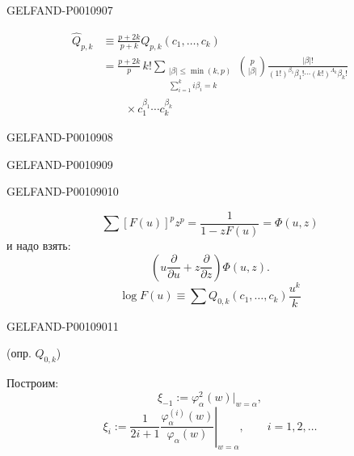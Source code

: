 \begin{GelfandAdjacentEvidence}{GELFAND-P001090}{7}


\begin{equation*}
\begin{aligned}
\widehat Q_{p,k}
&\equiv\frac{p+2k}{p+k}Q_{p,k}(c_1,\ldots,c_k)\\
&=\frac{p+2k}{p}\,k!
\sum_{\substack{\lvert\beta\rvert\le\min(k,p)\\\sum_{i=1}^k i\beta_i=k}}
\binom{p}{\lvert\beta\rvert}
\frac{\lvert\beta\rvert!}{(1!)^{\beta_1}\beta_1!\cdots(k!)^{\Lambda_k}\beta_k!}\\
&\qquad{}\times c_1^{\beta_1}\cdots c_k^{\beta_k}
\end{aligned}
\tag{7}
\end{equation*}
\end{GelfandAdjacentEvidence}
\begin{GelfandAdjacentEvidence}{GELFAND-P001090}{8}

\end{GelfandAdjacentEvidence}
\begin{GelfandAdjacentEvidence}{GELFAND-P001090}{9}

\end{GelfandAdjacentEvidence}
\begin{GelfandAdjacentEvidence}{GELFAND-P001090}{10}

\[
\sum[F(u)]^p z^p=\frac{1}{1-zF(u)}=\Phi(u,z)
\]
и надо взять:
\[
\left(u\frac{\partial}{\partial u}+z\frac{\partial}{\partial z}\right)\Phi(u,z).
\]
\begin{equation*}
\log F(u)\equiv\sum Q_{0,k}(c_1,\ldots,c_k)\frac{u^k}{k}
\tag{8}
\end{equation*}
\end{GelfandAdjacentEvidence}
\begin{GelfandAdjacentEvidence}{GELFAND-P001090}{11}

(опр. $Q_{0,k}$)

Построим:
\begin{equation*}
\xi_{-1}:=\varphi_\alpha^2(w)\big|_{w=\alpha},
\tag{9}
\end{equation*}
\begin{equation*}
\xi_i:=\frac{1}{2i+1}
\left.\frac{\varphi_\alpha^{(i)}(w)}{\varphi_\alpha(w)}\right|_{w=\alpha},
\qquad i=1,2,\ldots
\tag{10}
\end{equation*}
\end{GelfandAdjacentEvidence}



